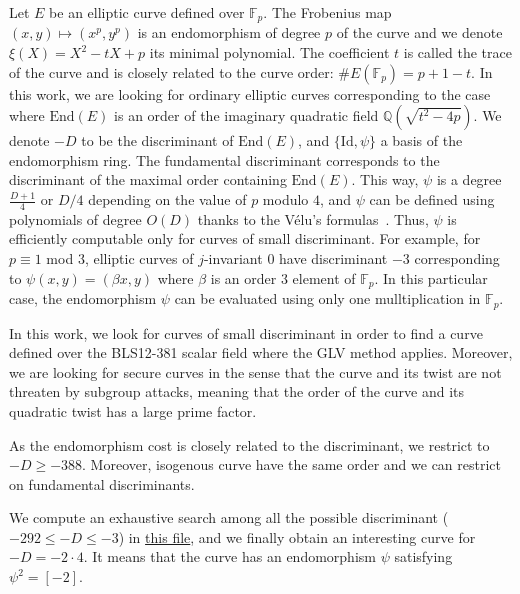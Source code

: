 \documentclass{amsart}
\newcommand{\Q}{\ensuremath{\mathbb Q}}
\newcommand{\Fp}{\ensuremath{\mathbb F_p}}
\newcommand{\End}{\ensuremath{\text{End}}}
\begin{document}
Let $E$ be an elliptic curve defined over $\Fp$. The Frobenius
map $(x,y)\mapsto (x^p,y^p)$ is an endomorphism of degree $p$ of the
curve and we denote $\xi(X) = X^2 - tX + p$ its minimal polynomial.
The coefficient $t$ is called the trace of the curve and is closely
related to the curve order: $\#E(\Fp) = p+1-t$.
In this work, we are looking for ordinary elliptic curves
corresponding to the case where $\End(E)$ is an order of the imaginary
quadratic field $\Q(\sqrt{t^2-4p})$.
We denote $-D$ to be the discriminant of $\End(E)$, and $\{\text{Id},\psi\}$
a basis of the endomorphism ring. The fundamental discriminant
corresponds to the discriminant of the maximal order containing $\End(E)$.
This way, $\psi$ is a degree $\frac{D+1}4$ or $D/4$ depending on the
value of $p$ modulo $4$, and $\psi$ can be defined using polynomials
of degree $O(D)$ thanks to the Vélu's formulas~\cite{velu71}.
Thus, $\psi$ is efficiently computable only for curves of small discriminant.
For example, for $p\equiv 1$ mod $3$, elliptic curves of $j$-invariant $0$
have discriminant $-3$ corresponding to $\psi(x,y) = (\beta x, y)$
where $\beta$ is an order $3$ element of $\Fp$.
In this particular case, the endomorphism $\psi$ can be evaluated
using only one mulltiplication in $\Fp$.

In this work, we look for curves of small discriminant in order to
find a curve defined over the BLS12-381 scalar field where the GLV
method applies. Moreover, we are looking for secure curves in the
sense that the curve and its twist are not threaten by subgroup
attacks, meaning that the order of the curve and its quadratic twist
has a large prime factor.

As the endomorphism cost is closely related to the discriminant, we
restrict to $-D \geq -388$. Moreover, isogenous curve have the same
order and we can restrict on fundamental discriminants.

We compute an exhaustive search among all the possible discriminant
($-292 \leq -D \leq -3$) in
\href{https://github.com/asanso/Bandersnatch/blob/main/code/small-disc-curves.py}{this
  file}, and we finally obtain an interesting curve for $-D = -2 \cdot 4$.
It means that the curve has an endomorphism $\psi$ satisfying $\psi^2
= [-2]$.
\end{document}
